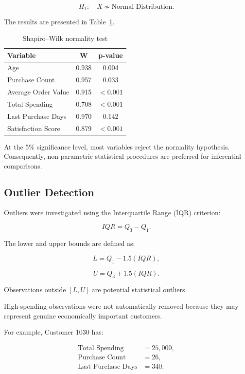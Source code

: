 \documentclass[11pt,a4paper]{article}
\newcommand{\Halt}{H_{1}}
\begin{document}
\[
\Halt:\quad X \not\sim \text{Normal Distribution}.
\]

The results are presented in Table~\ref{tab:normality}.

\begin{table}[H]
\centering
\caption{Shapiro--Wilk normality test}
\label{tab:normality}
\begin{tabular}{lcc}
\toprule
\textbf{Variable} & \textbf{W} & \textbf{p-value}\\
\midrule
Age & 0.938 & 0.004\\
Purchase Count & 0.957 & 0.033\\
Average Order Value & 0.915 & $<0.001$\\
Total Spending & 0.708 & $<0.001$\\
Last Purchase Days & 0.970 & 0.142\\
Satisfaction Score & 0.879 & $<0.001$\\
\bottomrule
\end{tabular}
\end{table}

At the 5\% significance level, most variables reject the normality hypothesis. Consequently, non-parametric statistical procedures are preferred for inferential comparisons.

\subsection{Outlier Detection}

Outliers were investigated using the Interquartile Range (IQR) criterion:

\[
IQR=Q_3-Q_1.
\]

The lower and upper bounds are defined as:

\[
L=Q_1-1.5(IQR),
\]

\[
U=Q_3+1.5(IQR).
\]

Observations outside $[L,U]$ are potential statistical outliers.

High-spending observations were not automatically removed because they may represent genuine economically important customers.

For example, Customer 1030 has:

\begin{align}
\text{Total Spending} &= 25,000,\\
\text{Purchase Count} &= 26,\\
\text{Last Purchase Days} &= 340.
\end{align}
\end{document}
